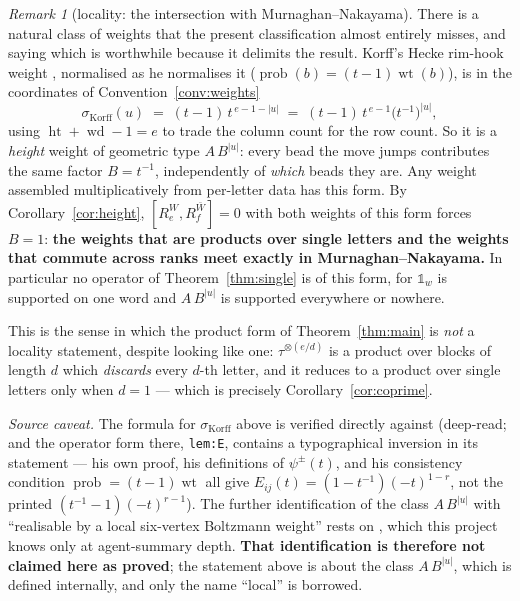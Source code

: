 \documentclass[11pt]{article}
\theoremstyle{definition}
\theoremstyle{remark}
\newtheorem{remark}[theorem]{Remark}
\newcommand{\hgt}{\operatorname{ht}}     %
\newcommand{\one}{\mathbb{1}}
\begin{document}
\begin{remark}[locality: the intersection with Murnaghan--Nakayama]\label{rem:local}
There is a natural class of weights that the present classification almost entirely misses, and
saying which is worthwhile because it delimits the result.  Korff's Hecke rim-hook weight
\cite[eq.~(Hecke\_wt)]{Korff}, normalised as he normalises it
($\operatorname{prob}(b)=(t-1)\operatorname{wt}(b)$), is in the coordinates of
Convention~\ref{conv:weights}
\[
   \sigma_{\mathrm{Korff}}(u)\;=\;(t-1)\,t^{\,e-1-|u|}\;=\;(t-1)\,t^{\,e-1}\bigl(t^{-1}\bigr)^{|u|} ,
\]
using $\hgt+\operatorname{wd}-1=e$ to trade the column count for the row count.  So it is a
\emph{height} weight of geometric type $A\,B^{|u|}$: every bead the move jumps contributes the
same factor $B=t^{-1}$, independently of \emph{which} beads they are.  Any weight assembled
multiplicatively from per-letter data has this form.  By Corollary~\ref{cor:height},
$[R_e^{W},R_f^{\bar W}]=0$ with both weights of this form forces $B=1$: \textbf{the weights that
are products over single letters and the weights that commute across ranks meet exactly in
Murnaghan--Nakayama.}  In particular no operator of Theorem~\ref{thm:single} is of this form,
for $\one_w$ is supported on one word and $A\,B^{|u|}$ is supported everywhere or nowhere.

This is the sense in which the product form of Theorem~\ref{thm:main} is \emph{not} a locality
statement, despite looking like one: $\tau^{\otimes(e/d)}$ is a product over blocks of length
$d$ which \emph{discards} every $d$-th letter, and it reduces to a product over single letters
only when $d=1$ --- which is precisely Corollary~\ref{cor:coprime}.

\emph{Source caveat.}  The formula for $\sigma_{\mathrm{Korff}}$ above is verified directly
against \cite{Korff} (deep-read; and the operator form there, \texttt{lem:E}, contains a
typographical inversion in its statement --- his own proof, his definitions of $\psi^{\pm}(t)$,
and his consistency condition $\operatorname{prob}=(t-1)\operatorname{wt}$ all give
$E_{ij}(t)=(1-t^{-1})(-t)^{1-r}$, not the printed $(t^{-1}-1)(-t)^{r-1}$).  The further
identification of the class $A\,B^{|u|}$ with ``realisable by a local six-vertex Boltzmann
weight'' rests on \cite[Rmk.~2.9]{Petrov}, which this project knows only at agent-summary
depth.  \textbf{That identification is therefore not claimed here as proved}; the statement
above is about the class $A\,B^{|u|}$, which is defined internally, and only the name
``local'' is borrowed.
\end{remark}
\end{document}
